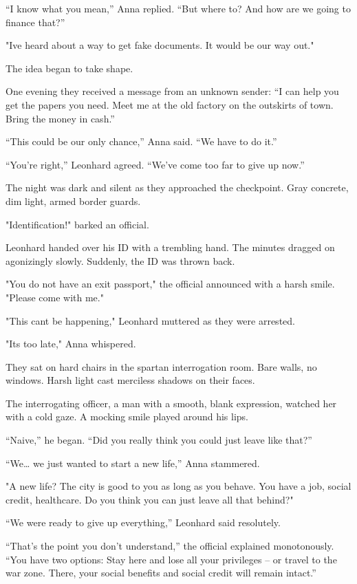 \documentclass[
]{article}
\begin{document}
``I know what you mean,'' Anna replied. ``But where to? And how are we going to finance that?''

"I\textquotesingle ve heard about a way to get fake documents. It would be our way out."

The idea began to take shape.

One evening they received a message from an unknown sender: ``I can help you get the papers you need. Meet me at the old factory on the outskirts of town. Bring the money in cash.''

``This could be our only chance,'' Anna said. ``We have to do it.''

``You're right,'' Leonhard agreed. ``We've come too far to give up now.''

The night was dark and silent as they approached the checkpoint. Gray concrete, dim light, armed border guards.

"Identification!" barked an official.

Leonhard handed over his ID with a trembling hand. The minutes dragged on agonizingly slowly. Suddenly, the ID was thrown back.

"You do not have an exit passport," the official announced with a harsh smile. "Please come with me."

"This can\textquotesingle t be happening," Leonhard muttered as they were arrested.

"It\textquotesingle s too late," Anna whispered.

They sat on hard chairs in the spartan interrogation room. Bare walls, no windows. Harsh light cast merciless shadows on their faces.

The interrogating officer, a man with a smooth, blank expression, watched her with a cold gaze. A mocking smile played around his lips.

``Naive,'' he began. ``Did you really think you could just leave like that?''

``We\ldots{} we just wanted to start a new life,'' Anna stammered.

"A new life? The city is good to you as long as you behave. You have a job, social credit, healthcare. Do you think you can just leave all that behind?"

``We were ready to give up everything,'' Leonhard said resolutely.

``That's the point you don't understand,'' the official explained monotonously. ``You have two options: Stay here and lose all your privileges -- or travel to the war zone. There, your social benefits and social credit will remain intact.''
\end{document}
